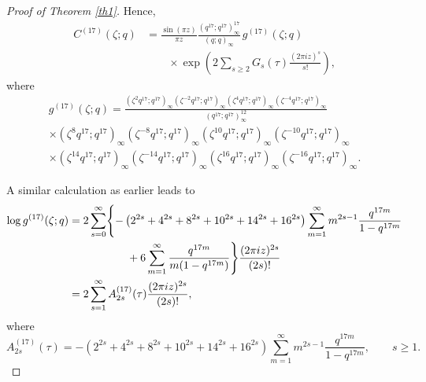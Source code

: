 \documentclass[12pt,oneside,reqno]{amsart}
\numberwithin{equation}{section}
\begin{document}
\begin{proof}[Proof of Theorem \ref{th1}]
	Hence,
	\begin{equation}
		\begin{aligned}
			C^{(17)}(\zeta;q)
			&=
			\frac{\sin(\pi z)}{\pi z}
			\frac{(q^{17};q^{17})_{\infty}^{17}}
			{(q;q)_{\infty}}
			\,g^{(17)}(\zeta;q)
			\\
			&\qquad\times
			\exp\left(
			2\sum_{s\ge2}
			G_s(\tau)
			\frac{(2\pi iz)^s}{s!}
			\right),
		\end{aligned}
		\label{eq:17gexp}
	\end{equation}
	where
	\begin{equation}
		\begin{aligned}
			g^{(17)}(\zeta;q)
			=
			\frac{
				(\zeta^{2}q^{17};q^{17})_{\infty}
				(\zeta^{-2}q^{17};q^{17})_{\infty}
				(\zeta^{4}q^{17};q^{17})_{\infty}
				(\zeta^{-4}q^{17};q^{17})_{\infty}
			}
			{(q^{17};q^{17})_{\infty}^{12}}
			\\[2mm]
			\times
			(\zeta^{8}q^{17};q^{17})_{\infty}
			(\zeta^{-8}q^{17};q^{17})_{\infty}
			(\zeta^{10}q^{17};q^{17})_{\infty}
			(\zeta^{-10}q^{17};q^{17})_{\infty}
			\\[2mm]
			\times
			(\zeta^{14}q^{17};q^{17})_{\infty}
			(\zeta^{-14}q^{17};q^{17})_{\infty}
			(\zeta^{16}q^{17};q^{17})_{\infty}
			(\zeta^{-16}q^{17};q^{17})_{\infty}.
		\end{aligned}
		\label{eq:17g}
	\end{equation}
	
	A similar calculation as earlier leads to
	\begin{align}
		\log g^{(17)}(\zeta;q)
		={}&
		2\sum_{s=0}^{\infty}
		\Biggl\{
		-\left(
		2^{2s}+4^{2s}+8^{2s}+10^{2s}+14^{2s}+16^{2s}
		\right)
		\sum_{m=1}^{\infty}
		m^{2s-1}
		\frac{q^{17m}}
		{1-q^{17m}}
		\notag\\
		&\qquad\qquad
		+
		6\sum_{m=1}^{\infty}
		\frac{q^{17m}}
		{m(1-q^{17m})}
		\Biggr\}
		\frac{(2\pi iz)^{2s}}{(2s)!}
		\notag\\
		={}&
		2\sum_{s=1}^{\infty}
		A^{(17)}_{2s}(\tau)
		\frac{(2\pi iz)^{2s}}{(2s)!},
		\label{eq:17coreA}
	\end{align}
	where
	\begin{equation}
		A^{(17)}_{2s}(\tau)
		=
		-\left(
		2^{2s}+4^{2s}+8^{2s}+10^{2s}+14^{2s}+16^{2s}
		\right)
		\sum_{m=1}^{\infty}
		m^{2s-1}
		\frac{q^{17m}}
		{1-q^{17m}},
		\qquad s\ge1.
	\end{equation}
	

\end{proof}
\end{document}
